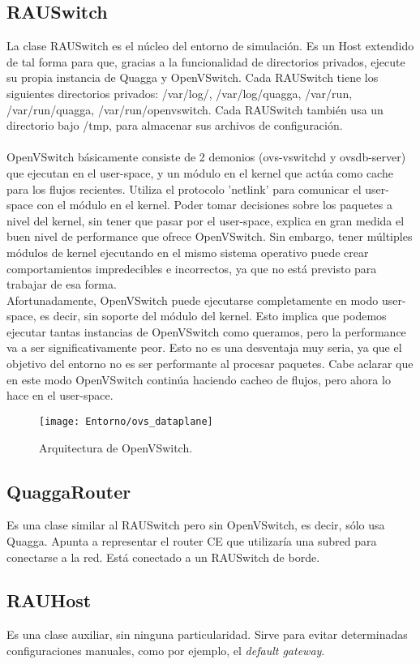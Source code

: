 \subsection{RAUSwitch}
La clase RAUSwitch es el núcleo del entorno de simulación. Es un Host extendido de tal forma para que, gracias a la funcionalidad de directorios privados, ejecute su propia instancia de Quagga y OpenVSwitch. Cada RAUSwitch tiene los siguientes directorios privados: /var/log/, /var/log/quagga, /var/run, /var/run/quagga, /var/run/openvswitch. Cada RAUSwitch también usa un directorio bajo /tmp, para almacenar sus archivos de configuración.\\ \\

OpenVSwitch básicamente consiste de 2 demonios (ovs-vswitchd y ovsdb-server) que ejecutan en el user-space, y un módulo en el kernel que actúa como cache para los flujos recientes. Utiliza el protocolo 'netlink' para comunicar el user-space con el módulo en el kernel. Poder tomar decisiones sobre los paquetes a nivel del kernel, sin tener que pasar por el user-space, explica en gran medida el buen nivel de performance que ofrece OpenVSwitch. Sin embargo, tener múltiples módulos de kernel ejecutando en el mismo sistema operativo puede crear comportamientos impredecibles e incorrectos, ya que no está previsto para trabajar de esa forma.\\
Afortunadamente, OpenVSwitch puede ejecutarse completamente en modo user-space, es decir, sin soporte del módulo del kernel. Esto implica que podemos ejecutar tantas instancias de OpenVSwitch como queramos, pero la performance va a ser significativamente peor. Esto no es una desventaja muy seria, ya que el objetivo del entorno no es ser performante al procesar paquetes. Cabe aclarar que en este modo OpenVSwitch continúa haciendo cacheo de flujos, pero ahora lo hace en el user-space.

\begin{figure}[t]
	\caption{Arquitectura de OpenVSwitch.}
	\texttt{[image: Entorno/ovs\_dataplane]}
	\centering
	\label{fig:ovs_dataplane}
\end{figure}

\subsection{QuaggaRouter}
Es una clase similar al RAUSwitch pero sin OpenVSwitch, es decir, sólo usa Quagga. Apunta a representar el router CE que utilizaría una subred para conectarse a la red. Está conectado a un RAUSwitch de borde.

\subsection{RAUHost}
Es una clase auxiliar, sin ninguna particularidad. Sirve para evitar determinadas configuraciones manuales, como por ejemplo, el \textit{default gateway}.

